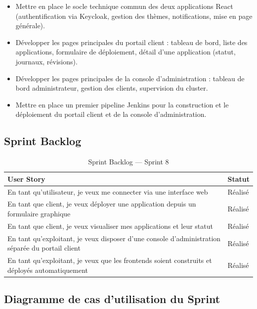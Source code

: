 \begin{itemize}
    \item Mettre en place le socle technique commun des deux applications React (authentification via Keycloak, gestion des thèmes, notifications, mise en page générale).
    \item Développer les pages principales du portail client : tableau de bord, liste des applications, formulaire de déploiement, détail d'une application (statut, journaux, révisions).
    \item Développer les pages principales de la console d'administration : tableau de bord administrateur, gestion des clients, supervision du cluster.
    \item Mettre en place un premier pipeline Jenkins pour la construction et le déploiement du portail client et de la console d'administration.
\end{itemize}

\subsection{Sprint Backlog}

\begin{table}[!ht]
\begin{center}
     \begin{tabular}{|l{11cm}|l{3cm}|}
     \hline
     \textbf{User Story} & \textbf{Statut} \\
     \hline
     En tant qu'utilisateur, je veux me connecter via une interface web & Réalisé \\
     \hline
     En tant que client, je veux déployer une application depuis un formulaire graphique & Réalisé \\
     \hline
     En tant que client, je veux visualiser mes applications et leur statut & Réalisé \\
     \hline
     En tant qu'exploitant, je veux disposer d'une console d'administration séparée du portail client & Réalisé \\
     \hline
     En tant qu'exploitant, je veux que les frontends soient construits et déployés automatiquement & Réalisé \\
     \hline
     \end{tabular}
     \caption{Sprint Backlog — Sprint 8}
     \label{tab:sb-sprint8}
     \end{center}
\end{table}

\subsection{Diagramme de cas d'utilisation du Sprint}

